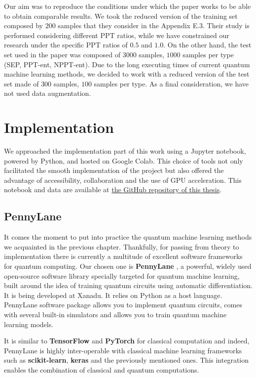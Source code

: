 Our aim was to reproduce the conditions under which the paper \cite{casale2023large} works to be able to obtain comparable results. We took the reduced version of the training set composed by $200$ samples that they consider in the Appendix E.3. Their study is performed considering different PPT ratios, while we have constrained our research under the specific PPT ratios of $0.5$ and $1.0$. On the other hand, the test set used in the paper was composed of $3000$ samples, $1000$ samples per type (SEP, PPT-ent, NPPT-ent). Due to the long executing times of current quantum machine learning methods, we decided to work with a reduced version of the test set made of $300$ samples, $100$ samples per type. As a final consideration, we have not used data augmentation. 



\section{Implementation}

We approached the implementation part of this work using a Jupyter notebook, powered by Python, and hosted on Google Colab. This choice of tools not only facilitated the smooth implementation of the project but also offered the advantage of accessibility, collaboration and the use of GPU acceleration. This notebook and data are available at \href{https://github.com/anamarsabi/tfg}{the GitHub repository of this thesis}.

\subsection{PennyLane}
It comes the moment to put into practice the quantum machine learning methods we acquainted in the previous chapter. Thankfully, for passing from theory to implementation there is currently a multitude of excellent software frameworks for quantum computing. Our chosen one is \textbf{PennyLane} \cite{bergholm2018pennylane}, a powerful, widely used open-source software library specially targeted for quantum machine learning, built around the idea of training quantum circuits using automatic differentiation. It is being developed at Xanadu. It relies on Python as a host language. PennyLane software package allows you to implement quantum circuits, comes with several built-in simulators and allows you to train quantum machine learning models.

It is similar to \textbf{TensorFlow} and \textbf{PyTorch} for classical computation and indeed, PennyLane is highly inter-operable with classical machine learning frameworks such as \textbf{scikit-learn}, \textbf{keras} and the previously mentioned ones.  This integration enables the combination of classical and quantum computations.

